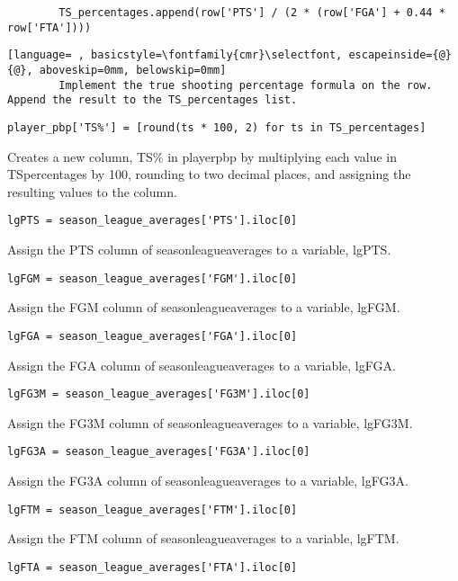 \documentclass{article}
\begin{document}
\begin{lstlisting}
        TS_percentages.append(row['PTS'] / (2 * (row['FGA'] + 0.44 * row['FTA'])))
\end{lstlisting}
\begin{lstlisting}[language= , basicstyle=\fontfamily{cmr}\selectfont, escapeinside={@}{@}, aboveskip=0mm, belowskip=0mm]
        Implement the true shooting percentage formula on the row. Append the result to the TS_percentages list.
\end{lstlisting}
\begin{lstlisting}
player_pbp['TS%'] = [round(ts * 100, 2) for ts in TS_percentages]
\end{lstlisting}
Creates a new column, TS\% in player\textunderscore pbp by multiplying each value in TS\textunderscore percentages by 100, rounding to two decimal places, and assigning the resulting values to the column.
\begin{lstlisting}
lgPTS = season_league_averages['PTS'].iloc[0]
\end{lstlisting}
Assign the PTS column of season\textunderscore league\textunderscore averages to a variable, lgPTS.
\begin{lstlisting}
lgFGM = season_league_averages['FGM'].iloc[0]
\end{lstlisting}
Assign the FGM column of season\textunderscore league\textunderscore averages to a variable, lgFGM.
\begin{lstlisting}
lgFGA = season_league_averages['FGA'].iloc[0]
\end{lstlisting}
Assign the FGA column of season\textunderscore league\textunderscore averages to a variable, lgFGA.
\begin{lstlisting}
lgFG3M = season_league_averages['FG3M'].iloc[0]
\end{lstlisting}
Assign the FG3M column of season\textunderscore league\textunderscore averages to a variable, lgFG3M.
\begin{lstlisting}
lgFG3A = season_league_averages['FG3A'].iloc[0]
\end{lstlisting}
Assign the FG3A column of season\textunderscore league\textunderscore averages to a variable, lgFG3A.
\begin{lstlisting}
lgFTM = season_league_averages['FTM'].iloc[0]
\end{lstlisting}
Assign the FTM column of season\textunderscore league\textunderscore averages to a variable, lgFTM.
\begin{lstlisting}
lgFTA = season_league_averages['FTA'].iloc[0]
\end{lstlisting}
\end{document}
